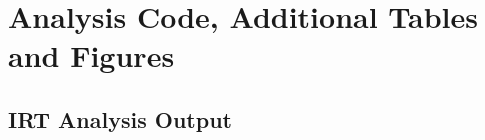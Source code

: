 \section{Analysis Code, Additional Tables and Figures}\label{app}


%     


%     


%     


\subsection{IRT Analysis Output}



\newpage
